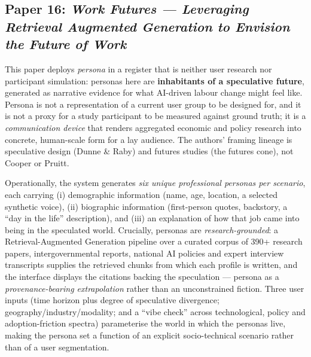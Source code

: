 

\subsection*{Paper 16: \textit{Work Futures --- Leveraging Retrieval Augmented Generation to Envision the Future of Work}}

This paper deploys \emph{persona} in a register that is neither user research nor participant simulation: personas here are \textbf{inhabitants of a speculative future}, generated as narrative evidence for what AI-driven labour change might feel like. Persona is not a representation of a current user group to be designed for, and it is not a proxy for a study participant to be measured against ground truth; it is a \emph{communication device} that renders aggregated economic and policy research into concrete, human-scale form for a lay audience. The authors' framing lineage is speculative design (Dunne \& Raby) and futures studies (the futures cone), not Cooper or Pruitt.

Operationally, the system generates \emph{six unique professional personas per scenario}, each carrying (i) demographic information (name, age, location, a selected synthetic voice), (ii) biographic information (first-person quotes, backstory, a ``day in the life'' description), and (iii) an explanation of how that job came into being in the speculated world. Crucially, personas are \emph{research-grounded}: a Retrieval-Augmented Generation pipeline over a curated corpus of 390+ research papers, intergovernmental reports, national AI policies and expert interview transcripts supplies the retrieved chunks from which each profile is written, and the interface displays the citations backing the speculation --- persona as a \emph{provenance-bearing extrapolation} rather than an unconstrained fiction. Three user inputs (time horizon plus degree of speculative divergence; geography/industry/modality; and a ``vibe check'' across technological, policy and adoption-friction spectra) parameterise the world in which the personas live, making the persona set a function of an explicit socio-technical scenario rather than of a user segmentation.

